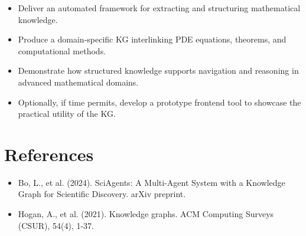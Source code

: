 \documentclass[10pt]{article}
\begin{document}
\begin{itemize}
  \item Deliver an automated framework for extracting and structuring mathematical knowledge.
  \item Produce a domain-specific KG interlinking PDE equations, theorems, and computational methods.
  \item Demonstrate how structured knowledge supports navigation and reasoning in advanced mathematical domains.
  \item Optionally, if time permits, develop a prototype frontend tool to showcase the practical utility of the KG.
\end{itemize}

\section*{References}
\begin{itemize}
  \item Bo, L., et al. (2024). SciAgents: A Multi-Agent System with a Knowledge Graph for Scientific Discovery. arXiv preprint.
  \item Hogan, A., et al. (2021). Knowledge graphs. ACM Computing Surveys (CSUR), 54(4), 1-37.
\end{itemize}
\end{document}
